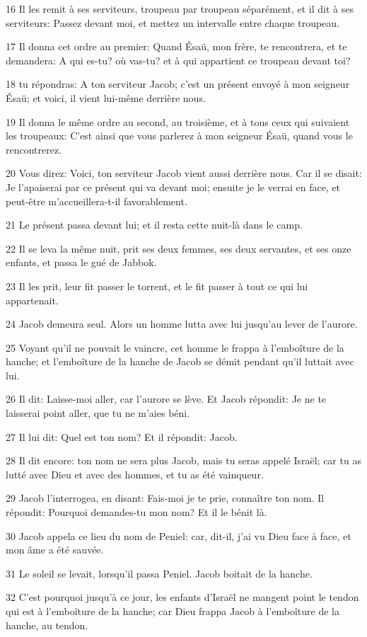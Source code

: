 \par 16 Il les remit à ses serviteurs, troupeau par troupeau séparément, et il dit à ses serviteurs: Passez devant moi, et mettez un intervalle entre chaque troupeau.
\par 17 Il donna cet ordre au premier: Quand Ésaü, mon frère, te rencontrera, et te demandera: A qui es-tu? où vas-tu? et à qui appartient ce troupeau devant toi?
\par 18 tu répondras: A ton serviteur Jacob; c'est un présent envoyé à mon seigneur Ésaü; et voici, il vient lui-même derrière nous.
\par 19 Il donna le même ordre au second, au troisième, et à tous ceux qui suivaient les troupeaux: C'est ainsi que vous parlerez à mon seigneur Ésaü, quand vous le rencontrerez.
\par 20 Vous direz: Voici, ton serviteur Jacob vient aussi derrière nous. Car il se disait: Je l'apaiserai par ce présent qui va devant moi; ensuite je le verrai en face, et peut-être m'accueillera-t-il favorablement.
\par 21 Le présent passa devant lui; et il resta cette nuit-là dans le camp.
\par 22 Il se leva la même nuit, prit ses deux femmes, ses deux servantes, et ses onze enfants, et passa le gué de Jabbok.
\par 23 Il les prit, leur fit passer le torrent, et le fit passer à tout ce qui lui appartenait.
\par 24 Jacob demeura seul. Alors un homme lutta avec lui jusqu'au lever de l'aurore.
\par 25 Voyant qu'il ne pouvait le vaincre, cet homme le frappa à l'emboîture de la hanche; et l'emboîture de la hanche de Jacob se démit pendant qu'il luttait avec lui.
\par 26 Il dit: Laisse-moi aller, car l'aurore se lève. Et Jacob répondit: Je ne te laisserai point aller, que tu ne m'aies béni.
\par 27 Il lui dit: Quel est ton nom? Et il répondit: Jacob.
\par 28 Il dit encore: ton nom ne sera plus Jacob, mais tu seras appelé Israël; car tu as lutté avec Dieu et avec des hommes, et tu as été vainqueur.
\par 29 Jacob l'interrogea, en disant: Fais-moi je te prie, connaître ton nom. Il répondit: Pourquoi demandes-tu mon nom? Et il le bénit là.
\par 30 Jacob appela ce lieu du nom de Peniel: car, dit-il, j'ai vu Dieu face à face, et mon âme a été sauvée.
\par 31 Le soleil se levait, lorsqu'il passa Peniel. Jacob boitait de la hanche.
\par 32 C'est pourquoi jusqu'à ce jour, les enfants d'Israël ne mangent point le tendon qui est à l'emboîture de la hanche; car Dieu frappa Jacob à l'emboîture de la hanche, au tendon.

